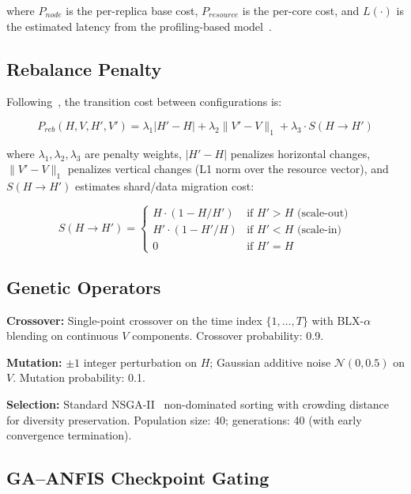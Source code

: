 \documentclass[conference]{IEEEtran}
\begin{document}
\noindent where $P_{node}$ is the per-replica base cost, $P_{resource}$ is the per-core cost, and $L(\cdot)$ is the estimated latency from the profiling-based model~\cite{razavi2024tale}.

\subsection{Rebalance Penalty}

Following~\cite{abdullah2025diagonal}, the transition cost between configurations is:

\begin{equation}
\label{eq:rebalance}
P_{reb}(H, V, H', V') = \lambda_1|H' - H| + \lambda_2\|V' - V\|_1 + \lambda_3 \cdot S(H \to H')
\end{equation}

\noindent where $\lambda_1, \lambda_2, \lambda_3$ are penalty weights, $|H'-H|$ penalizes horizontal changes, $\|V'-V\|_1$ penalizes vertical changes (L1 norm over the resource vector), and $S(H \to H')$ estimates shard/data migration cost:

\begin{equation}
S(H \to H') = \begin{cases}
H \cdot (1 - H/H') & \text{if } H' > H \text{ (scale-out)}\\
H' \cdot (1 - H'/H) & \text{if } H' < H \text{ (scale-in)}\\
0 & \text{if } H' = H
\end{cases}
\end{equation}

\subsection{Genetic Operators}

\textbf{Crossover:} Single-point crossover on the time index $\{1,\ldots,T\}$ with BLX-$\alpha$ blending on continuous $V$ components. Crossover probability: 0.9.

\textbf{Mutation:} $\pm 1$ integer perturbation on $H$; Gaussian additive noise $\mathcal{N}(0, 0.5)$ on $V$. Mutation probability: 0.1.

\textbf{Selection:} Standard NSGA-II~\cite{deb2002fast} non-dominated sorting with crowding distance for diversity preservation. Population size: 40; generations: 40 (with early convergence termination).

\subsection{GA--ANFIS Checkpoint Gating}
\end{document}
